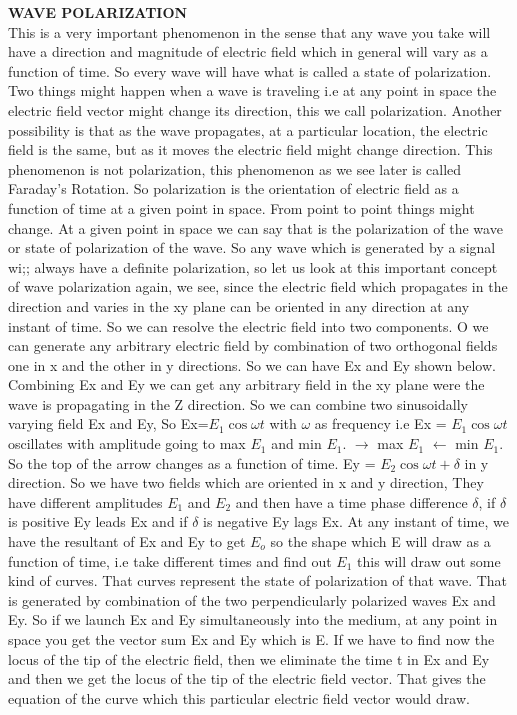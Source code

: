 \textbf{WAVE POLARIZATION}\\

This is a very important phenomenon in the sense that any wave you take will have a direction and magnitude of electric field which in general will vary as a function of time. So every wave will have what is called a state of polarization. Two things might happen when a wave is traveling i.e at any point in space the electric field vector might change its direction, this we call polarization. Another possibility is that as the wave propagates, at a particular location, the electric field is the same, but as it moves the electric field might change direction. This phenomenon is not polarization, this phenomenon as we see later is called Faraday's Rotation. So polarization is the orientation of electric field as a function of time at a given point in space. From point to point things might change.  At a given point in space we can say that is the polarization of the wave or state of polarization of the wave. So any wave which is generated by a signal wi;; always have a definite polarization, so let  us look at this important concept of wave polarization again, we  see, since the electric field which propagates in the direction and varies in the xy plane can be oriented in any direction at any instant of time. So we can resolve the electric field into two components. O we can generate any arbitrary electric field by combination of two orthogonal fields one in x and the other in y directions. So we can  have Ex and Ey shown below. \\

Combining Ex and Ey we can get any arbitrary field in the xy plane were the wave is propagating in the Z direction. So we can combine two sinusoidally varying field Ex and Ey, So Ex=$E_{1}\cos\omega t$ with $\omega$ as frequency i.e Ex = $E_{1}\cos\omega t$ oscillates with amplitude going to max $E_{1}$ and min $E_{1}$. $\longrightarrow$ max $E_{1}$ $\longleftarrow$ min $E_{1}$. So the top of the arrow changes as a function of time. Ey  = $E_{2}\cos\omega t + \delta$ in y direction. So we have two fields which are oriented in x and y direction, They have different amplitudes $E_{1}$ and $E_{2}$ and then have a time phase difference $\delta$, if $\delta$ is positive Ey leads Ex and if $\delta$ is negative Ey lags Ex. At any instant of time, we have the resultant of Ex and Ey to get $E_{o}$ so the shape which E will draw as a function of time, i.e take different times and find out $E_{1}$ this will draw out some kind of curves. That curves represent the state of polarization of that wave. That is generated by combination of the two perpendicularly polarized waves Ex and Ey. So if we launch Ex and Ey simultaneously into the medium, at any point in space you get the vector sum Ex and Ey which is E. If we have to find now the locus of the tip of the electric field, then we eliminate the time t in Ex and Ey and then we get the locus of the tip of the electric field vector. That gives the equation of the curve which this particular electric field vector would draw.\\

